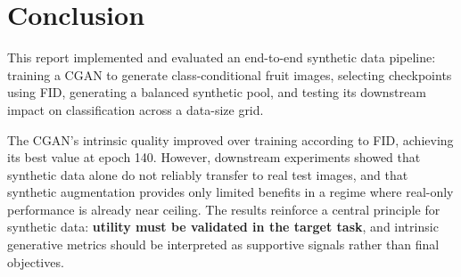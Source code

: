 \section{Conclusion}

This report implemented and evaluated an end-to-end synthetic data pipeline: training a CGAN to generate class-conditional fruit images, selecting checkpoints using FID, generating a balanced synthetic pool, and testing its downstream impact on classification across a data-size grid.

The CGAN's intrinsic quality improved over training according to FID, achieving its best value at epoch 140. However, downstream experiments showed that synthetic data alone do not reliably transfer to real test images, and that synthetic augmentation provides only limited benefits in a regime where real-only performance is already near ceiling. The results reinforce a central principle for synthetic data: \textbf{utility must be validated in the target task}, and intrinsic generative metrics should be interpreted as supportive signals rather than final objectives.
